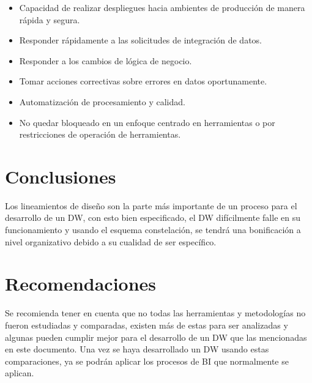 \documentclass[twoside,twocolumn]{article}
\begin{document}
\begin{itemize}
    \item Capacidad de realizar despliegues hacia ambientes de producción de manera rápida y segura. 
    \item Responder rápidamente a las solicitudes de integración de datos.
    \item Responder a los cambios de lógica de negocio.
    \item Tomar acciones correctivas sobre errores en datos oportunamente.
    \item Automatización de procesamiento y calidad.
    \item No quedar bloqueado en un enfoque centrado en herramientas o por restricciones de operación de herramientas.  
\end{itemize}


\section{Conclusiones}
Los lineamientos de diseño son la parte más importante de un proceso para el desarrollo de un DW, con esto bien especificado, el DW difícilmente falle en su funcionamiento y usando el esquema constelación, se tendrá una bonificación a nivel organizativo debido a su cualidad de ser específico. 

\section{Recomendaciones}
Se recomienda tener en cuenta que no todas las herramientas y metodologías no fueron estudiadas y comparadas, existen más de estas para ser analizadas y algunas pueden cumplir mejor para el desarrollo de un DW que las mencionadas en este documento.
Una vez se haya desarrollado un DW usando estas comparaciones, ya se podrán aplicar los procesos de BI que normalmente se aplican. 
 
 
\end{document}
